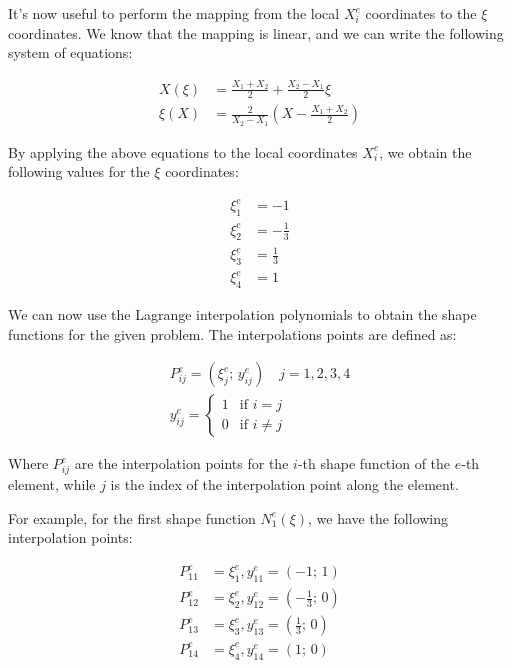 It's now useful to perform the mapping from the local $X_i^e$ coordinates to the $\xi$ coordinates.
We know that the mapping is linear, and we can write the following system of equations:

\begin{align}
    X(\xi) & = \frac{X_1+X_2}{2} + \frac{X_2-X_1}{2} \xi \\
    \xi(X) & = \frac{2}{X_2-X_1} (X - \frac{X_1+X_2}{2})
\end{align}

By applying the above equations to the local coordinates $X_i^e$, we obtain the following values for the $\xi$ coordinates:

\begin{align}
    \xi_1^e & = -1           \\
    \xi_2^e & = -\frac{1}{3} \\
    \xi_3^e & = \frac{1}{3}  \\
    \xi_4^e & = 1
\end{align}

We can now use the Lagrange interpolation polynomials to obtain the shape functions for the given problem.
The interpolations points are defined as:

\begin{align}
    P_{ij}^e = (\xi_j^e \text{; } y_{ij}^e) \quad j = 1, 2, 3, 4 \\
    y_{ij}^e = \begin{cases}
                   1 & \text{if } i = j    \\
                   0 & \text{if } i \neq j
               \end{cases}
\end{align}

Where $P_{ij}^e$ are the interpolation points for the $i$-th shape function of the $e$-th element, while $j$ is the index of the interpolation point along the element.

For example, for the first shape function $N_1^e(\xi)$, we have the following interpolation points:

\begin{align}
    P_{11}^e & = {\xi_1^e, y_{11}^e} = (-1 \text{; } 1)           \\
    P_{12}^e & = {\xi_2^e, y_{12}^e} = (-\frac{1}{3} \text{; } 0) \\
    P_{13}^e & = {\xi_3^e, y_{13}^e} = (\frac{1}{3} \text{; } 0)  \\
    P_{14}^e & = {\xi_4^e, y_{14}^e} = (1 \text{; } 0)
\end{align}

